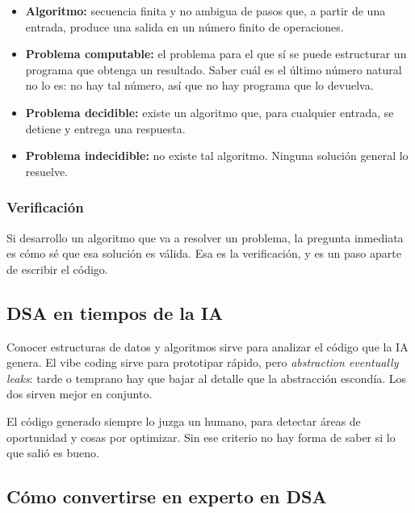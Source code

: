 \documentclass[11pt,letterpaper]{article}
\begin{document}
\begin{itemize}
    \item \textbf{Algoritmo:} secuencia finita y no ambigua de pasos que, a
          partir de una entrada, produce una salida en un número finito
          de operaciones.
    \item \textbf{Problema computable:} el problema para el que sí se puede estructurar un programa que obtenga un resultado. Saber
          cuál es el último número natural no lo es: no hay tal número, así que no hay programa que lo devuelva.
    \item \textbf{Problema decidible:} existe un algoritmo que, para cualquier entrada, se detiene y entrega una respuesta.
    \item \textbf{Problema indecidible:} no existe tal algoritmo. Ninguna solución general lo resuelve.
\end{itemize}


\subsubsection*{Verificación}

Si desarrollo un algoritmo que va a resolver un problema, la pregunta
inmediata es cómo sé que esa solución es válida. Esa es la
verificación, y es un paso aparte de escribir el código.


\subsection*{DSA en tiempos de la IA}

Conocer estructuras de datos y algoritmos sirve para analizar el código
que la IA genera. El vibe coding sirve para prototipar rápido, pero
\textit{abstraction eventually leaks}: tarde o temprano hay que bajar
al detalle que la abstracción escondía. Los dos sirven mejor en
conjunto.

\begin{ojo}
  El código generado siempre lo juzga un humano, para detectar áreas de
  oportunidad y cosas por optimizar. Sin ese criterio no hay forma de
  saber si lo que salió es bueno.
\end{ojo}


\subsection*{Cómo convertirse en experto en DSA}
\end{document}
